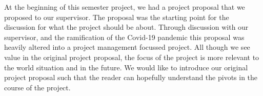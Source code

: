 At the beginning of this semester project, we had a project proposal that we proposed to our supervisor.
The proposal was the starting point for the discussion for what the project should be about.
Through discussion with our supervisor, and the ramification of the Covid-19 pandemic this proposal was heavily altered into a project management focussed project.
All though we see value in the original project proposal, the focus of the project is more relevant to the world situation and in the future.
We would like to introduce our original project proposal such that the reader can hopefully understand the pivots in the course of the project. 